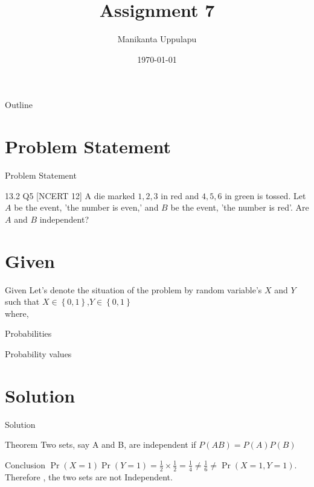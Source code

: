 \documentclass{beamer}
\title{Assignment 7}
\author{Manikanta Uppulapu}
\date{\today}
\providecommand{\cbrak}[1]{\ensuremath{\left\{#1\right\}}}
\providecommand{\cbrak}[1]{\ensuremath{\left\{#1\right\}}}
\begin{document}
\begin{frame}
    \titlepage 
\end{frame}

\logo{}


\begin{frame}{Outline}
    \tableofcontents
\end{frame}



\section{Problem Statement}
\begin{frame}{Problem Statement}
    \begin{block}{13.2 Q5 [NCERT 12] }A die marked $1, 2, 3$ in red and $4, 5, 6$ in green is tossed. Let $A$ be the event, 'the number is even,' and $B$ be the event, 'the number is red'. Are $A$ and $B$ independent?
    \end{block}
\end{frame}



\section{Given}
\begin{frame}{Given}
Let's denote the situation of the problem by random variable's $X$ and $Y$  such that $X\in \cbrak{0,1}$,$Y\in \cbrak{0,1}$\\
where,\\
\begin{table}[ht!]
    \centering
    
    \caption{}
\label{table:table1}
\end{table}

  
\end{frame}

\begin{frame}{Probabilities}
\begin{table}[ht!]
    \centering
    
    \caption{Probability values}
\label{table:table1}
\end{table}

\end{frame}

\section{Solution}
\begin{frame}{Solution}
\begin{exampleblock}{Theorem}
        Two sets, say A and B, are independent if $P(AB) = P(A)P(B)$
   \end{exampleblock}
   \begin{block}{Conclusion}
        $\Pr(X=1)\Pr(Y=1) = \frac{1}{2} \times \frac{1}{2} =   \frac{1}{4} \neq \frac{1}{6} \neq \Pr(X=1,Y=1)$.\\
        Therefore , the two sets are not Independent.
    \end{block}

\end{frame}
\end{document}
